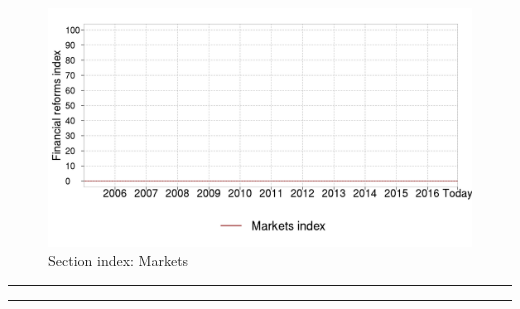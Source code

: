 \documentclass[a4paper,12pt,leqno]{article}
\makeatletter
\renewenvironment{titlepage}
{%
  \cleardoublepage
  \if@twocolumn
  \@restonecoltrue\onecolumn
  \else
  \@restonecolfalse\newpage
  \fi
  \thispagestyle{empty}%
}%
{\if@restonecol\twocolumn \else \newpage \fi
}
\renewenvironment{titlepage}
{%
  \cleardoublepage
  \if@twocolumn
  \@restonecoltrue\onecolumn
  \else
  \@restonecolfalse\newpage
  \fi
  \thispagestyle{empty}%
}%
{\if@restonecol\twocolumn \else \newpage \fi
  \if@twoside\else
  \fi
}
\newlength{\textwidthorig}
\makeatother
\begin{document}
\begin{table} [H]
  \caption{Section index: Markets}
  \begin{threeparttable}
    \begin{footnotesize}
    \end{footnotesize}
  \end{threeparttable}
\end{table}

\begin{figure}[H]
\caption{Section index: Markets}
\centering
\includegraphics[width=0.9\paperwidth,height=0.7\paperwidth]{../GRAPHS/frm_index_markets.png}
\end{figure}



\begin{titlepage}

  \parbox{\textwidthorig}{
  \hrule
  \vspace{\baselineskip} 
  \vspace{\baselineskip}
  \hrule
  }

  \parbox{\textwidthorig}{
}

\end{titlepage}
\end{document}
